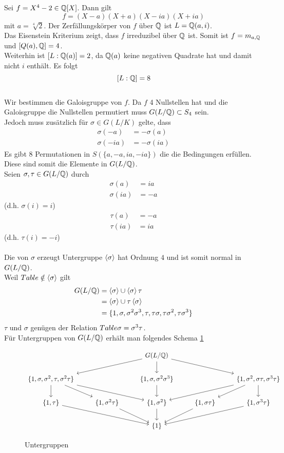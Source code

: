 	\begin{exm}
		Sei $f=X^4-2\in\mathbb{Q}[X]$. Dann gilt
		\[f=(X-a)(X+a)(X-ia)(X+ia)\]
		mit $a=\sqrt[4]{2}$. Der Zerfällungskörper von $f$ über $\mathbb{Q}$ ist $L=\mathbb{Q}(a,i)$.\\
		Das Eisenstein Kriterium zeigt, dass $f$ irreduzibel über $\mathbb{Q}$ ist. Somit ist $f=m_{a,\mathbb{Q}}$ und $[Q(a),\mathbb{Q}]=4$.\\
		Weiterhin ist $[L:\mathbb{Q}(a)]=2$, da $\mathbb{Q}(a)$ keine negativen Quadrate hat und damit nicht $i$ enthält. Es folgt
		\[[L:\mathbb{Q}]=8\]
		\\
		Wir bestimmen die Galoisgruppe von $f$. Da $f$ 4 Nullstellen hat und die Galoisgruppe die Nullstellen permutiert muss $G(L/\mathbb{Q})\subset S_4$ sein.\\
		Jedoch muss zusätzlich für $\sigma\in G(L/K)$ gelte, dass
		\begin{align*}
		\sigma(-a)&=-\sigma(a)\\
		\sigma(-ia)&=-\sigma(ia)
		\end{align*}
		Es gibt $8$ Permutationen in $S(\{a,-a,ia,-ia\})$ die die Bedingungen erfüllen.\\
		Diese sind somit die Elemente in $G(L/\mathbb{Q})$.\\
		Seien $\sigma,\tau\in G(L/\mathbb{Q})$ durch
		\begin{align*}
		\sigma(a)&=ia\\
		\sigma(ia)&=-a
		\end{align*}
		(d.h. $\sigma(i)=i$)
		\begin{align*}
		\tau(a)&=-a\\
		\tau(ia)&=ia
		\end{align*}
		(d.h. $\tau(i)=-i$)\\
		\\
		Die von $\sigma$ erzeugt Untergruppe $\left\langle\sigma\right\rangle$ hat Ordnung $4$ und ist somit normal in $G(L/\mathbb{Q})$.\\
		Weil $\tablename\notin\grp{\sigma}$ gilt
		\begin{align*}
		G(L/\mathbb{Q})&=\left\langle\sigma\right\rangle\cup\left\langle\sigma\right\rangle\tau\\
		&=\left\langle\sigma\right\rangle\cup\tau\left\langle\sigma\right\rangle\\
		&=\{1,\sigma,\sigma^2\sigma^3,\tau,\tau\sigma,\tau\sigma^2,\tau\sigma^3\}
		\end{align*}
		$\tau$ und $\sigma$ genügen der Relation $\tablename\sigma=\sigma^3\tau$.\\
		Für Untergruppen von $G(L/\mathbb{Q})$ erhält man folgendes Schema \ref{fig:GalUG}
		
		\begin{figure}[h]
			\centering
			\[\begin{tikzcd}
				&&G(L/\Q)\ar[lld]\ar[d]\ar[rrd]&&\\
				\{1,\sigma,\sigma^2,\tau,\sigma^2\tau\}\ar[d]\ar[rd]\ar[rrd]&&\{1,\sigma,\sigma^2\sigma^3\}\ar[d]&&\{1,\sigma^2,\sigma\tau,\sigma^3\tau\}\ar[lld]\ar[ld]\ar[d]\\
				\{1,\tau\}\ar[drr]&\{1,\sigma^2\tau\}\ar[rd]&\{1,\sigma^2\}\ar[d]&\{1,\sigma\tau\}\ar[dl]&\{1,\sigma^3\tau\}\ar[lld]\\
				&&\{1\}&&
			\end{tikzcd}\]
			\caption{Untergruppen}
			\label{fig:GalUG}
		\end{figure}
	\end{exm}
